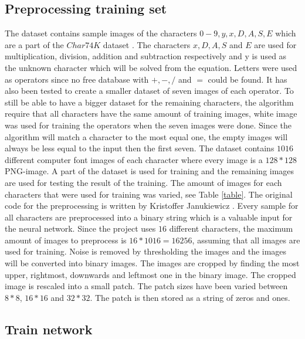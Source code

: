 \documentclass[12pt]{report}
\begin{document}
\subsection*{Preprocessing training set}

The dataset contains sample images of the characters $0-9, y, x, D , A, S, E$ which are a part of the $Char74K$ dataset \cite{dataset}. The characters $x, D, A, S$ and $E$ are used for multiplication, division, addition and subtraction respectively and y is used as the unknown character which will be solved from the equation. Letters were used as operators since no free database with $+,-,/$ and $=$ could be found. It has also been tested to create a smaller dataset of seven images of each operator. To still be able to have a bigger dataset for the remaining characters, the algorithm require that all characters have the same amount of training images, white image was used for training the operators when the seven images were done. Since the algorithm will match a character to the most equal one, the empty images will always be less equal to the input then the first seven.  
\newline
\newline
The dataset contains $1016$ different computer font images of each character where every image is a $128*128$ PNG-image. A part of the dataset is used for training and the remaining images are used for testing the result of the training. The amount of images for each characters that were used for training was varied, see Table \ref{table}.
\newline
\newline
The original code for the preprocessing is written by Kristoffer Janukiewicz \cite{preprocessing}. Every sample for all characters are preprocessed into a binary string which is a valuable input for the neural network. Since the project uses $16$ different characters, the maximum amount of images to preprocess is $16*1016 = 16256$, assuming that all images are used for training. Noise is removed by thresholding the images and the images will be converted into binary images. The images are cropped by finding the most upper, rightmost, downwards and leftmost one in the binary image. The cropped image is rescaled into a small patch. The patch sizes have been varied between $8*8$, $16*16$ and $32*32$. The patch is then stored as a string of zeros and ones. 


\subsection*{Train network}
\end{document}
